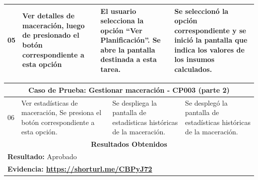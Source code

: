 \begin{minipage}{0.95\textwidth}
\begin{center}
\begin{tabularx}{\textwidth}{ | p{2cm} | X | X | X |}
        \hline
        05 & Ver detalles de maceración, luego de presionado el botón correspondiente a esta opción & El usuario selecciona la opción ``Ver Planificación''. Se abre la pantalla destinada a esta tarea.& Se seleccionó la opción correspondiente y se inició la pantalla que indica los valores de los insumos calculados.\\
        \hline
        \end{tabularx}
        \label{CP003-p1}
        \end{center}
        \end{minipage}
        
        \begin{minipage}{0.95\textwidth}
        \begin{center}
        \begin{tabularx}{\textwidth}{ | p{2cm} | X | X | X |}
        \hline
        \multicolumn{4}{|c|}{\textbf{Caso de Prueba: Gestionar maceración - CP003 (parte 2)}} \\
        \hline
        06 & Ver estadísticas de maceración, Se presiona el botón correspondiente a esta opción. & Se despliega la pantalla de estadísticas históricas de  la maceración.& Se desplegó la pantalla de estadísticas históricas de  la maceración.\\
        \hline
        \multicolumn{4}{|c|}{\textbf{Resultados Obtenidos}} \\
        \hline
        \multicolumn{4}{|l|}{\textbf{Resultado:} Aprobado} \\
        \hline
        \multicolumn{4}{|l|}{\textbf{Evidencia: \url{https://shorturl.me/CBPyJ72}}} \\
        \hline
     \end{tabularx}
    \label{CP003-p2}
    \end{center}
    

\end{minipage}

